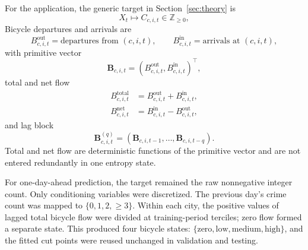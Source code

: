 For the application, the generic target in Section~\ref{sec:theory} is
\begin{equation}
X_t\longmapsto C_{c,i,t}\in\mathbb Z_{\geq0},
\label{eq:crime_count_definition}
\end{equation}
 Bicycle
departures and arrivals are
\begin{equation}
B^{\mathrm{out}}_{c,i,t}
=\text{departures from }(c,i,t),
\qquad
B^{\mathrm{in}}_{c,i,t}
=\text{arrivals at }(c,i,t),
\label{eq:bicycle_in_out}
\end{equation}
with primitive vector
\begin{equation}
\mathbf B_{c,i,t}
=
(B^{\mathrm{out}}_{c,i,t},B^{\mathrm{in}}_{c,i,t})^\top,
\label{eq:bicycle_primitive_vector}
\end{equation}
total and net flow
\begin{align}
B^{\mathrm{total}}_{c,i,t}
&=B^{\mathrm{out}}_{c,i,t}+B^{\mathrm{in}}_{c,i,t},
\label{eq:bicycle_total_flow}\\
B^{\mathrm{net}}_{c,i,t}
&=B^{\mathrm{in}}_{c,i,t}-B^{\mathrm{out}}_{c,i,t},
\label{eq:bicycle_net_flow}
\end{align}
and lag block
\begin{equation}
\mathbf B^{(q)}_{c,i,t}
=
(\mathbf B_{c,i,t-1},\ldots,\mathbf B_{c,i,t-q}).
\label{eq:bicycle_lag_block}
\end{equation}
Total and net flow are deterministic functions of the primitive vector and
are not entered redundantly in one entropy state.

For one-day-ahead prediction, the target remained the raw nonnegative
integer count. Only conditioning variables were discretized. The previous
day's crime count was mapped to
\(\{0,1,2,\geq 3\}\). Within each city, the positive values of lagged total
bicycle flow were divided at training-period terciles; zero flow formed a
separate state. This produced four bicycle states:
\(\{\text{zero},\text{low},\text{medium},\text{high}\}\), and the fitted
cut points were reused unchanged in validation and testing.

